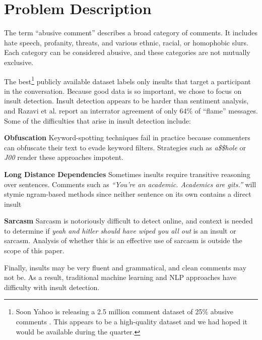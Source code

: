 \documentclass{article} %
\begin{document}
\section*{Problem Description}
The term ``abusive comment'' describes a broad category of comments. It includes hate speech, profanity, threats, and various ethnic, racial, or homophobic slurs. Each category can be considered abusive, and these categories are not mutually exclusive. 

The best\footnote{Soon Yahoo is releasing a 2.5 million comment dataset of 25\% abusive comments \cite{DBLP:conf/www/NobataTTMC16}. This appears to be a high-quality dataset and we had hoped it would be available during the quarter.} publicly available dataset \cite{kaggle-data} labels only insults that target a participant in the conversation. Because good data is so important, we chose to focus on insult detection.
Insult detection appears to be harder than sentiment analysis, and Razavi et al. \cite{Razavi2010} report an interrator agreement of only 64\% of ``flame'' messages. Some of the difficulties that arise in insult detection include:

\textbf{Obfuscation} Keyword-spotting techniques fail in practice because commenters can obfuscate their text to evade keyword filters. Strategies such as \textit{a\$\$hole} or \textit{J00} render these approaches impotent. 

\textbf{Long Distance Dependencies} Sometimes insults require transitive reasoning over sentences. Comments such as \textit{``You’re an academic. Academics are gits.''} will stymie ngram-based methods since neither sentence on its own contains a direct insult

\textbf{Sarcasm} Sarcasm is notoriously difficult to detect online, and context is needed to determine if \textit{yeah and hitler should have wiped you all out} is an insult or sarcasm. Analysis of whether this is an effective use of sarcasm is outside the scope of this paper. 

Finally, insults may be very fluent and grammatical, and clean comments may not be. As a result, traditional machine learning and NLP approaches have difficulty with insult detection.

\end{document}
